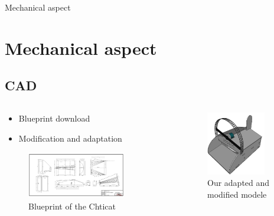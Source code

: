 \documentclass{beamer}
\begin{document}
	\begin{frame}{Mechanical aspect}
		\section[Mechanical]{Mechanical aspect}
		\subsection{CAD}
		\begin{columns}[T]
	  		\begin{column}{0.5\textwidth}
		    	\begin{itemize}
		    		\item Blueprint download
		    		\item Modification and adaptation
		    	\end{itemize}
		    	\begin{figure}
	    			\includegraphics[width=0.8\textwidth]{../Illus/Source_Chticat.png}
	    			\caption{Blueprint of the Chticat}
	    		 \end{figure}
	  		\end{column}
	  		\begin{column}{0.5\textwidth}
	    		\begin{figure}
	    			\includegraphics[width=0.8\textwidth]{../Illus/AeroProt.png}
	    			\caption{Our adapted and modified modele}
	    		 \end{figure}
	  		\end{column}
		\end{columns}
		
	\end{frame}
\end{document}
